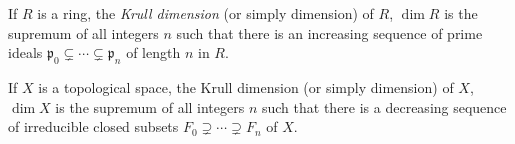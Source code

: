\documentclass[12pt]{article}
\begin{document}
If $R$ is a ring, the \emph{Krull dimension} (or simply dimension) of $R$, $\dim R$ is the supremum of all integers $n$ such that there is an increasing sequence of prime ideals $\mathfrak{p}_0 \subsetneq \cdots \subsetneq \mathfrak{p}_n$ of length $n$ in $R$.

If $X$ is a topological space, the Krull dimension (or simply dimension) of $X$, $\dim X$ is the supremum of all integers $n$ such that there is a decreasing sequence of irreducible closed subsets $F_0 \supsetneq \cdots \supsetneq F_n$ of $X$.
\end{document}

